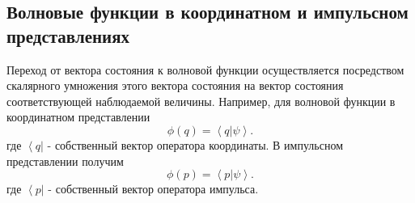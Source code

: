 \subsection{Волновые  функции  в  координатном  и  импульсном  представлениях}
Переход от вектора состояния к волновой функции осуществляется
посредством скалярного умножения этого вектора состояния на вектор
состояния соответствующей наблюдаемой величины. Например, для волновой
функции в координатном представлении 
\begin{equation}
\phi\left(q\right) = \left<q\right|\left.\psi\right>.
\end{equation}  
где $\left<q\right|$ - собственный вектор оператора координаты. 
В импульсном представлении получим
\begin{equation}
\phi\left(p\right) = \left<p\right|\left.\psi\right>.
\end{equation}  
где $\left<p\right|$ - собственный вектор оператора импульса.

